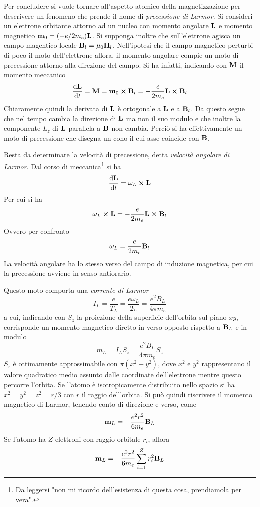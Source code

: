 Per concludere si vuole tornare all'aspetto atomico della magnetizzazione
per descrivere un fenomeno che prende il nome di \textit{precessione di Larmor}.
Si consideri un elettrone orbitante attorno ad un nucleo con momento angolare
$\vb{L}$ e momento magnetico $\vb{m}_0=(-e/2m_e)\vb{L}$. Si supponga inoltre
che sull'elettrone agisca un campo magentico locale $\vb{B}_l=\mu_0\vb{H}_l$.
Nell'ipotesi che il campo magnetico perturbi di poco il moto dell'elettrone
allora, il momento angolare compie un moto di precessione attorno alla direzione
del campo. Si ha infatti, indicando con $\vb{M}$ il momento meccanico
\[
\dv{\vb{L}}{t}=\vb{M}=\vb{m}_0\cp\vb{B}_l=-\frac{e}{2m_e}\vb{L}\cp\vb{B}_l
\]
Chiaramente quindi la derivata di $\vb{L}$ è ortogonale a $\vb{L}$ e a $\vb{B}_l$.
Da questo segue che nel tempo cambia la direzione di $\vb{L}$ ma non il suo modulo
e che inoltre la componente $L_z$ di $\vb{L}$ parallela a $\vb{B}$ non cambia.
Perciò si ha effettivamente un moto di precessione che disegna un cono il cui asse
coincide con $\vb{B}$.

Resta da determinare la velocità di precessione, detta
\textit{velocità angolare di Larmor}. Dal corso di meccanica\footnote{Da leggersi
"non mi ricordo dell'esistenza di questa cosa, prendiamola per vera".} si ha
\[
\dv{\vb{L}}{t}=\vb{\omega}_L\cp\vb{L}
\]
Per cui si ha
\[
\vb{\omega}_L\cp\vb{L}=-\frac{e}{2m_e}\vb{L}\cp\vb{B}_l
\]
Ovvero per confronto
\[
\vb{\omega}_L=\frac{e}{2m_e}\vb{B}_l
\]
La velocità angolare ha lo stesso verso del campo di induzione magnetica, per cui la precessione
avviene in senso antiorario.

Questo moto comporta una \textit{corrente di Larmor}
\[
I_L=\frac{e}{T_L}=\frac{e\omega_L}{2\pi}=\frac{e^2B_L}{4\pi m_e}
\]
a cui, indicando con $S_z$ la proiezione della superficie dell'orbita sul piano $xy$, corrisponde
un momento magnetico diretto in verso opposto rispetto a $\vb{B}_L$ e in modulo
\[
m_L=I_L S_z=\frac{e^2B_L}{4\pi m_e} S_z
\]
$S_z$ è ottimamente approssimabile con $\pi(x^2+y^2)$, dove $x^2$ e $y^2$ rappresentano il valore
quadratico medio assunto dalle coordinate dell'elettrone mentre questo percorre l'orbita. Se
l'atomo è isotropicamente distribuito nello spazio si ha $x^2=y^2=z^2=r/3$ con $r$ il raggio
dell'orbita. Si può quindi riscrivere il momento magnetico di Larmor, tenendo conto di direzione e verso,
come
\[
\vb{m}_L=-\frac{e^2r^2}{6m_e} \vb{B}_L
\]
Se l'atomo ha $Z$ elettroni con raggio orbitale $r_i$, allora
\[
\vb{m}_L=-\frac{e^2r^2}{6m_e}\sum_{i=1}^Z r_i^2 \vb{B}_L
\]
